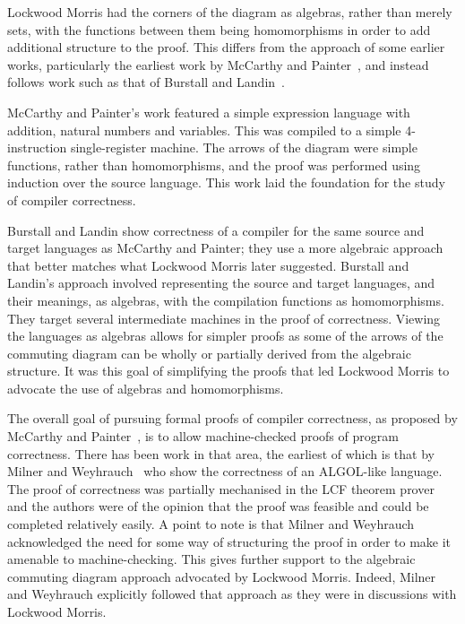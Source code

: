 \documentclass[a4paper,10pt]{report}
\begin{document}
Lockwood Morris had the corners of the diagram as algebras, rather than merely
sets, with the functions between them being homomorphisms in order to add
additional structure to the proof.  This differs from the approach of some
earlier works, particularly the earliest work by McCarthy and
Painter~\cite{mccarthy1967}, and instead follows work such as that of Burstall
and Landin~\cite{burstall1969}.

McCarthy and Painter's work featured a simple expression language with addition,
natural numbers and variables.  This was compiled to a simple 4-instruction
single-register machine.  The arrows of the diagram were simple functions,
rather than homomorphisms, and the proof was performed using induction over the
source language. This work laid the foundation for the study of compiler
correctness.

Burstall and Landin show correctness of a compiler for the same source and
target languages as McCarthy and Painter; they use a more algebraic approach
that better matches what Lockwood Morris later suggested.  Burstall and Landin's
approach involved representing the source and target languages, and their
meanings, as algebras, with the compilation functions as homomorphisms. They
target several intermediate machines in the proof of correctness. Viewing the
languages as algebras allows for simpler proofs as some of the arrows of the
commuting diagram can be wholly or partially derived from the algebraic
structure. It was this goal of simplifying the proofs that led Lockwood Morris
to advocate the use of algebras and homomorphisms.

The overall goal of pursuing formal proofs of compiler correctness, as proposed
by McCarthy and Painter~\cite{mccarthy1967}, is to allow machine-checked proofs
of program correctness. There has been work in that area, the earliest of which
is that by Milner and Weyhrauch~\cite{milner1972} who show the correctness of an
ALGOL-like language. The proof of correctness was partially mechanised in the
LCF theorem prover~\cite{milner1972a} and the authors were of the opinion that
the proof was feasible and could be completed relatively easily. A point to note
is that Milner and Weyhrauch acknowledged the need for some way of structuring
the proof in order to make it amenable to machine-checking. This gives further
support to the algebraic commuting diagram approach advocated by Lockwood
Morris. Indeed, Milner and Weyhrauch explicitly followed that approach as they
were in discussions with Lockwood Morris.
\end{document}
